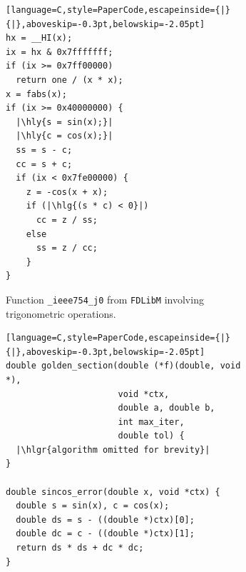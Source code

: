 \documentclass[acmsmall]{acmart}
\newcommand{\gordianhighlight}[2]{%
  \begingroup
  \setlength{\fboxsep}{0pt}%
  \colorbox{#1}{\kern1pt\raisebox{0pt}[\dimexpr\height+2pt\relax][\dimexpr\depth+2pt\relax]{#2}\kern1pt}%
  \endgroup
}
\newcommand{\hly}[1]{\gordianhighlight{yellow!50}{#1}}
\newcommand{\hlgr}[1]{\gordianhighlight{gray!30}{#1}}
\newcommand{\hlg}[1]{\gordianhighlight{green!50}{#1}}
\theoremstyle{definition}
\begin{document}
\begin{figure}
  \centering
  \begin{subfigure}[b]{0.24\textwidth}
    \centering
{
\scriptsize          
\begin{lstlisting}[language=C,style=PaperCode,escapeinside={|}{|},aboveskip=-0.3pt,belowskip=-2.05pt]
hx = __HI(x);
ix = hx & 0x7fffffff;
if (ix >= 0x7ff00000)
  return one / (x * x);
x = fabs(x);
if (ix >= 0x40000000) {
  |\hly{s = sin(x);}|
  |\hly{c = cos(x);}|
  ss = s - c;
  cc = s + c;
  if (ix < 0x7fe00000) {
    z = -cos(x + x);
    if (|\hlg{(s * c) < 0}|)
      cc = z / ss;
    else
      ss = z / cc;
    }
}
\end{lstlisting}
}
    \caption{Function \texttt{\_ieee754\_j0} from \texttt{FDLibM} involving trigonometric operations.}
    \label{fig:ieee754}
  \end{subfigure}
  \hfill
  \begin{subfigure}[b]{0.36\textwidth}
    \centering
{
\tiny          
\begin{lstlisting}[language=C,style=PaperCode,escapeinside={|}{|},aboveskip=-0.3pt,belowskip=-2.05pt]
double golden_section(double (*f)(double, void *),
                      void *ctx,
                      double a, double b,
                      int max_iter,
                      double tol) {
  |\hlgr{algorithm omitted for brevity}|
}
                      
double sincos_error(double x, void *ctx) {
  double s = sin(x), c = cos(x);
  double ds = s - ((double *)ctx)[0];
  double dc = c - ((double *)ctx)[1];
  return ds * ds + dc * dc;
}


\end{lstlisting}}
\end{subfigure}
\end{figure}
\end{document}
